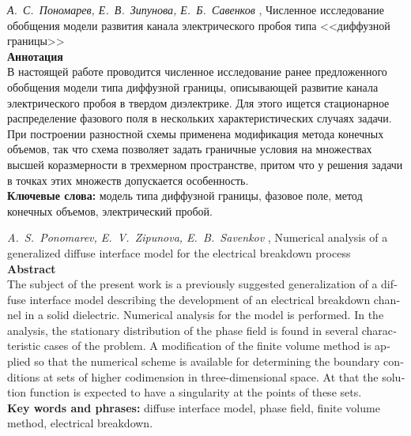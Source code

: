 \documentclass[a4paper,12pt]{article}
\theoremstyle{plain}
\theoremstyle{remark}
\newcommand{\PreprintTitle}{
	Численное исследование обобщения модели развития канала электрического пробоя типа <<диффузной границы>>
}
\newcommand{\PreprintTitleEnglish}{
	Numerical analysis of a generalized diffuse interface model for the electrical breakdown process
}
\newcommand{\PreprintAuthors}{
	А.~С.~Пономарев, Е.~В.~Зипунова, Е.~Б.~Савенков
}
\newcommand{\PreprintAuthorsEnglish}{
	A.~S.~Ponomarev, E.~V.~Zipunova, E.~B.~Savenkov
}
\begin{document}
\noindent \emph{\PreprintAuthors}, \PreprintTitle \\[3mm]
\textbf{Аннотация} \\
{
	\small
	В настоящей работе проводится численное исследование ранее предложенного обобщения модели типа диффузной границы, описывающей развитие канала электрического пробоя в твердом диэлектрике. Для этого ищется стационарное распределение фазового поля в нескольких характеристических случаях задачи. При построении разностной схемы применена модификация метода конечных объемов, так что схема позволяет задать граничные условия на множествах высшей коразмерности в трехмерном пространстве, притом что у решения задачи в точках этих множеств допускается особенность. \\[3mm]
	\textbf{Ключевые слова:} модель типа диффузной границы, фазовое поле, метод конечных объемов, электрический пробой. \\[5mm]
}
\begin{otherlanguage}{english}
\emph{\PreprintAuthorsEnglish}, \PreprintTitleEnglish \\[3mm]
\textbf{Abstract} \\
{
	\small
	The subject of the present work is a previously suggested generalization of a diffuse interface model describing the development of an electrical breakdown channel in a solid dielectric. Numerical analysis for the model is performed. In the analysis, the stationary distribution of the phase field is found in several characteristic cases of the problem. A modification of the finite volume method is applied so that the numerical scheme is available for determining the boundary conditions at sets of higher codimension in three-dimensional space. At that the solution function is expected to have a singularity at the points of these sets. \\[3mm]
	\textbf{Key words and phrases:} diffuse interface model, phase field, finite volume method, electrical breakdown. \\[5mm]
}
\end{otherlanguage}

\clearpage













\clearpage
\printbibliography

\clearpage
\tableofcontents
\end{document}
